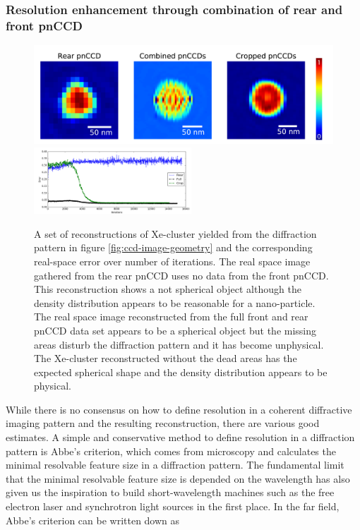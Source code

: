 \subsubsection{Resolution enhancement through combination of rear and front pnCCD}
\begin{figure}
  \begin{center}
   \includegraphics[width=0.95\linewidth]{images/Phase-retrieval-image.png}\\
   \includegraphics[height=2.5cm]{images/Phase-retrieval-error.png}
    \caption{A set of reconstructions of Xe-cluster yielded from the diffraction pattern in figure \ref{fig:ccd-image-geometry} and the corresponding real-space error over number of iterations. The real space image gathered from the rear pnCCD uses no data from the front pnCCD. This reconstruction shows a not spherical object although the density distribution appears to be reasonable for a nano-particle. The real space image reconstructed from the full front and rear pnCCD data set appears to be a spherical object but the missing areas disturb the diffraction pattern and it has become unphysical. The Xe-cluster reconstructed without the dead areas has the expected spherical shape and the density distribution appears to be physical.}
\label{fig:phase-retrieval-image}
  \end{center}
\end{figure}
While there is no consensus on how to define resolution in a coherent diffractive imaging pattern and the resulting reconstruction, there are various good estimates. A simple and conservative method to define resolution in a diffraction pattern is Abbe's criterion, which comes from microscopy and calculates the minimal resolvable feature size in a diffraction pattern. The fundamental limit that the minimal resolvable feature size is depended on the wavelength has also given us the inspiration to build short-wavelength machines such as the free electron laser and synchrotron light sources in the first place. In the far field, Abbe's criterion can be written down as
